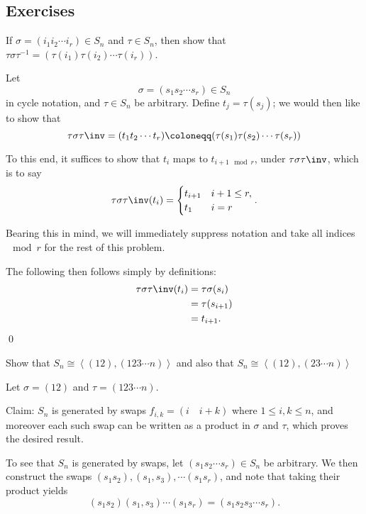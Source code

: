 \subsection{Exercises}

\begin{problem}[Hungerford 1.6.3]
If $\sigma = (i_1 i_2 \cdots i_r) \in S_n$ and $\tau \in S_n$, then show that $\tau\sigma\tau^{-1} = (\tau(i_1) \tau(i_2) \cdots \tau(i_r))$.
\end{problem}

\begin{solution}
  Let
  $$\sigma = (s_1 s_2 \cdots s_r) \in S_n$$
  in cycle notation, and $\tau \in S_n$ be arbitrary. Define $t_j = \tau(s_j)$; we would then like to show that $$\tau\sigma\tau\inv = (t_1 t_2 \cdots t_r) \coloneqq (\tau(s_1) \tau(s_2) \cdots \tau(s_r))$$

  To this end, it suffices to show that $t_i$ maps to $t_{i+1 \mod r}$, under $\tau\sigma\tau\inv$, which is to say
  $$
  \tau\sigma\tau\inv(t_i) =
  \begin{cases}
    t_{i+1} & i+1 \leq r, \\
    t_1 & i = r
  \end{cases}.
  $$

  Bearing this in mind, we will immediately suppress notation and take all indices $\mod r$ for the rest of this problem.

  The following then follows simply by definitions:
  \begin{align*}
  \tau\sigma\tau\inv(t_i) &= \tau\sigma(s_i) \\
                          &= \tau(s_{i+1}) \\
                          &= t_{i+1}
  .\end{align*}
  \qed
\end{solution}

\begin{problem}[Hungerford 1.6.4]
\label{prob:1.2}
Show that $S_n \cong \left\langle (12), (123\cdots n)\right\rangle$ and also that $S_n \cong \left\langle (12), (23\cdots n)\right\rangle$
\end{problem}

\begin{solution}
  Let $\sigma = (12)$ and $\tau = (123\cdots n)$.

  Claim: $S_n$ is generated by swaps $f_{i, k} = (i \quad i+k)$ where  $1 \leq i, k \leq n$, and moreover each such swap can be written as a product in $\sigma$ and $\tau$, which proves the desired result.

  To see that $S_n$ is generated by swaps, let $(s_1 s_2 \cdots s_r) \in S_n$ be arbitrary. We then construct the swaps $(s_1 s_2), (s_1, s_3), \cdots (s_1 s_r)$, and note that taking their product yields
  $$
  (s_1 s_2)(s_1, s_3)\cdots(s_1 s_r) = (s_1 s_2 s_3 \cdots s_r).
  $$


\end{solution}

